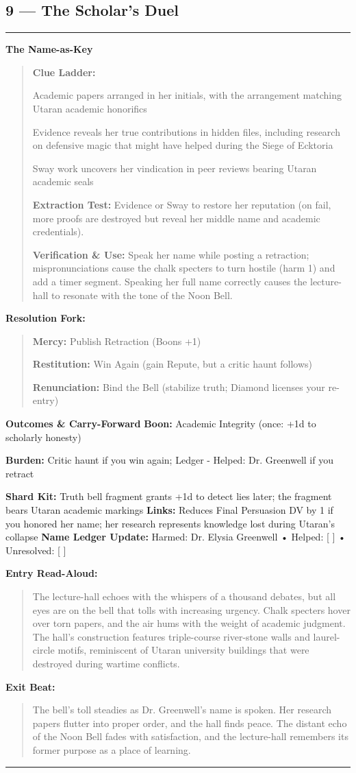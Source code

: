 \documentclass[18pt, letterpaper, twoside]{article}
\newenvironment{floorbox}[1]{%
    \begin{center}
    \begin{minipage}{0.95\textwidth}
    \subsection*{#1}
    \vspace{-0.5em}
    \rule{\textwidth}{0.5pt}
    \vspace{0.5em}
}{%
    \vspace{0.5em}
    \rule{\textwidth}{0.5pt}
    \end{minipage}
    \end{center}
}
\newenvironment{gmnote}[1]{%
    \vspace{0.5em}
    \noindent\textbf{#1}
    \begin{quote}
}{%
    \end{quote}
    \vspace{0.5em}
}
\newenvironment{resolutionbox}{%
    \vspace{0.5em}
    \noindent\textbf{Resolution Fork:}
    \begin{quote}
}{%
    \end{quote}
    \vspace{0.5em}
}
\newenvironment{boxedtext}[1]{%
    \vspace{0.5em}
    \noindent\textbf{#1}
    \begin{quote}
}{%
    \end{quote}
    \vspace{0.5em}
}
\newcommand{\boon}[1]{\noindent\textbf{Boon:} #1\par}
\newcommand{\burden}[1]{\noindent\textbf{Burden:} #1\par}
\newcommand{\entrytext}[1]{\begin{boxedtext}{Entry Read-Aloud:} #1 \end{boxedtext}}
\newcommand{\exittext}[1]{\begin{boxedtext}{Exit Beat:} #1 \end{boxedtext}}
\begin{document}
\begin{floorbox}{9 --- The Scholar's Duel}
\begin{gmnote}{The Name-as-Key}
\textbf{Clue Ladder:}
\begin{description}[leftmargin=*, style=unboxed]
    \item[Gentle Nudge:] Academic papers arranged in her initials, with the arrangement matching Utaran academic honorifics
    \item[Actionable Lead:] Evidence reveals her true contributions in hidden files, including research on defensive magic that might have helped during the Siege of Ecktoria
    \item[Aha! Proof:] Sway work uncovers her vindication in peer reviews bearing Utaran academic seals
\end{description}

\textbf{Extraction Test:} Evidence or Sway to restore her reputation (on fail, more proofs are destroyed but reveal her middle name and academic credentials).

\textbf{Verification \& Use:} Speak her name while posting a retraction; mispronunciations cause the chalk specters to turn hostile (harm 1) and add a timer segment. Speaking her full name correctly causes the lecture-hall to resonate with the tone of the Noon Bell.
\end{gmnote}

\begin{resolutionbox}
\textbf{Mercy:} Publish Retraction (Boons +1)

\textbf{Restitution:} Win Again (gain Repute, but a critic haunt follows)

\textbf{Renunciation:} Bind the Bell (stabilize truth; Diamond licenses your re-entry)
\end{resolutionbox}

\textbf{Outcomes \& Carry-Forward}
\boon{Academic Integrity (once: +1d to scholarly honesty)}
\burden{Critic haunt if you win again; Ledger - Helped: Dr. Greenwell if you retract}
\textbf{Shard Kit:} Truth bell fragment grants +1d to detect lies later; the fragment bears Utaran academic markings
\textbf{Links:} Reduces Final Persuasion DV by 1 if you honored her name; her research represents knowledge lost during Utaran's collapse
\textbf{Name Ledger Update:} Harmed: Dr. Elysia Greenwell • Helped: [ ] • Unresolved: [ ]

\entrytext{The lecture-hall echoes with the whispers of a thousand debates, but all eyes are on the bell that tolls with increasing urgency. Chalk specters hover over torn papers, and the air hums with the weight of academic judgment. The hall's construction features triple-course river-stone walls and laurel-circle motifs, reminiscent of Utaran university buildings that were destroyed during wartime conflicts.}

\exittext{The bell's toll steadies as Dr. Greenwell's name is spoken. Her research papers flutter into proper order, and the hall finds peace. The distant echo of the Noon Bell fades with satisfaction, and the lecture-hall remembers its former purpose as a place of learning.}
\end{floorbox}
\end{document}
